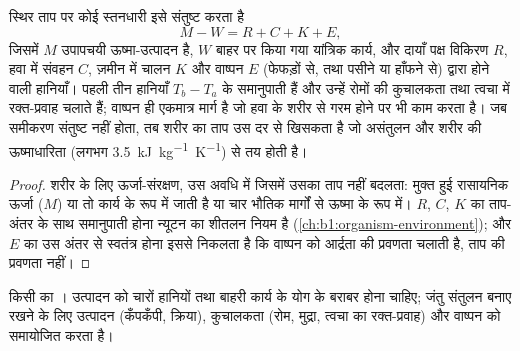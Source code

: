 \begin{proposition}[ऊष्मा-बजट]\label{prop:b1:mammal-organization:heatbudget}
स्थिर ताप पर कोई स्तनधारी इसे संतुष्ट करता है
\[
M - W = R + C + K + E ,
\]
जिसमें $M$ उपापचयी ऊष्मा-उत्पादन है, $W$ बाहर पर किया गया यांत्रिक कार्य,
और दायाँ पक्ष विकिरण $R$, हवा में संवहन $C$, ज़मीन में चालन $K$ और वाष्पन
$E$ (फेफड़ों से, तथा पसीने या हाँफने से) द्वारा होने वाली हानियाँ। पहली
तीन हानियाँ $T_b - T_a$ के समानुपाती हैं और उन्हें रोमों की कुचालकता तथा
त्वचा में रक्त-प्रवाह चलाते हैं; वाष्पन ही एकमात्र मार्ग है जो हवा के
शरीर से गरम होने पर भी काम करता है। जब समीकरण संतुष्ट नहीं होता, तब शरीर
का ताप उस दर से खिसकता है जो असंतुलन और शरीर की ऊष्माधारिता (लगभग
\qty{3.5}{kJ.kg^{-1}.K^{-1}}) से तय होती है।
\end{proposition}
\begin{proof}
शरीर के लिए ऊर्जा-संरक्षण, उस अवधि में जिसमें उसका ताप नहीं बदलता:
मुक्त हुई रासायनिक ऊर्जा ($M$) या तो कार्य के रूप में जाती है या चार
भौतिक मार्गों से ऊष्मा के रूप में। $R$, $C$, $K$ का ताप-अंतर के साथ
समानुपाती होना न्यूटन का शीतलन नियम है
(\cref{ch:b1:organism-environment}); और $E$ का उस अंतर से स्वतंत्र होना
इससे निकलता है कि वाष्पन को आर्द्रता की प्रवणता चलाती है, ताप की प्रवणता
नहीं।
\end{proof}

\begin{omfigure}

{\small किसी  का । उत्पादन को चारों हानियों तथा बाहरी
कार्य के योग के बराबर होना चाहिए; जंतु संतुलन बनाए रखने के लिए उत्पादन
(कँपकँपी, क्रिया), कुचालकता (रोम, मुद्रा, त्वचा का रक्त-प्रवाह) और
वाष्पन को समायोजित करता है।}
\end{omfigure}

